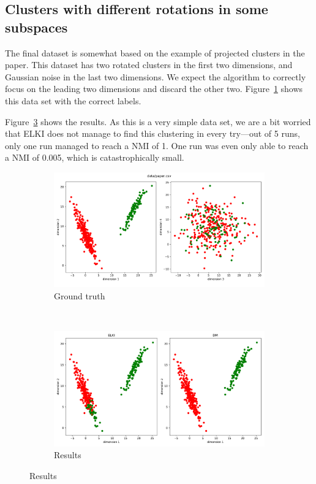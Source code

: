 \documentclass[english]{scrartcl}
\begin{document}
\subsection{Clusters with different rotations in some subspaces}

The final dataset is somewhat based on the example of projected clusters
in the paper. This dataset has two rotated clusters in the first two dimensions,
and Gaussian noise in the last two dimensions. We expect the algorithm to
correctly focus on the leading two dimensions and discard the other two.
Figure~\ref{fig:true_paper} shows this data set with the correct labels.

Figure~\ref{fig:paper_results} shows the results. As this is a very simple
data set, we are a bit worried that ELKI does not manage to find this
clustering in every try---out of 5 runs, only one run managed to reach a
NMI of 1. One run was even only able to reach a NMI of 0.005, which is
catastrophically small.

\begin{figure}[p]
    \centering
    \begin{subfigure}{\textwidth}
        \includegraphics[width=\textwidth]{img/paper}
        \caption{Ground truth}
        \label{fig:true_paper}
    \end{subfigure}%
    \\
    \begin{subfigure}{\textwidth}
        \includegraphics[width=\textwidth]{img/paper_cmp}
        \caption{Results}
        \label{fig:paper_results}
    \end{subfigure}
\end{figure}
\end{document}
